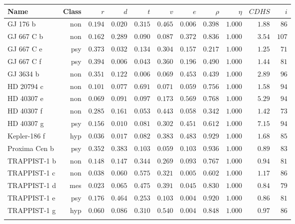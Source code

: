 \begin{tabular}{l r r r r r r r r r r}
  \toprule
  Name & Class & $r$ & $d$ & $t$ & $v$ & $e$ & $\rho$ & $\eta$ & $\mathit{CDHS}$ & $i$\\
  \midrule
GJ 176 b & non & $0.194$ & $0.020$ & $0.315$ & $0.465$ & $0.006$ & $0.398$ & $1.000$ & $1.88$ & $ 86$\\
GJ 667 C b & non & $0.162$ & $0.289$ & $0.090$ & $0.087$ & $0.372$ & $0.836$ & $1.000$ & $3.54$ & $107$\\
GJ 667 C e & psy & $0.373$ & $0.032$ & $0.134$ & $0.304$ & $0.157$ & $0.217$ & $1.000$ & $1.25$ & $ 71$\\
GJ 667 C f & psy & $0.394$ & $0.006$ & $0.043$ & $0.360$ & $0.196$ & $0.490$ & $1.000$ & $1.44$ & $ 81$\\
GJ 3634 b & non & $0.351$ & $0.122$ & $0.006$ & $0.069$ & $0.453$ & $0.439$ & $1.000$ & $2.89$ & $ 96$\\
HD 20794 c & non & $0.101$ & $0.077$ & $0.691$ & $0.071$ & $0.059$ & $0.756$ & $1.000$ & $1.58$ & $ 94$\\
HD 40307 e & non & $0.069$ & $0.091$ & $0.097$ & $0.173$ & $0.569$ & $0.768$ & $1.000$ & $5.29$ & $ 94$\\
HD 40307 f & non & $0.285$ & $0.161$ & $0.053$ & $0.443$ & $0.058$ & $0.342$ & $1.000$ & $1.42$ & $ 73$\\
HD 40307 g & psy & $0.156$ & $0.010$ & $0.081$ & $0.302$ & $0.451$ & $0.612$ & $1.000$ & $7.15$ & $ 94$\\
Kepler-186 f & hyp & $0.036$ & $0.017$ & $0.082$ & $0.383$ & $0.483$ & $0.929$ & $1.000$ & $1.68$ & $ 85$\\
Proxima Cen b & psy & $0.352$ & $0.383$ & $0.103$ & $0.059$ & $0.103$ & $0.936$ & $1.000$ & $0.89$ & $ 83$\\
TRAPPIST-1 b & non & $0.148$ & $0.147$ & $0.344$ & $0.269$ & $0.093$ & $0.767$ & $1.000$ & $0.94$ & $ 81$\\
TRAPPIST-1 c & non & $0.038$ & $0.060$ & $0.575$ & $0.321$ & $0.005$ & $0.602$ & $1.000$ & $1.17$ & $ 86$\\
TRAPPIST-1 d & mes & $0.023$ & $0.065$ & $0.475$ & $0.391$ & $0.045$ & $0.830$ & $1.000$ & $0.84$ & $ 79$\\
TRAPPIST-1 e & psy & $0.176$ & $0.464$ & $0.253$ & $0.103$ & $0.004$ & $0.920$ & $1.000$ & $0.86$ & $ 81$\\
TRAPPIST-1 g & hyp & $0.060$ & $0.086$ & $0.310$ & $0.540$ & $0.004$ & $0.848$ & $1.000$ & $0.97$ & $ 86$\\
  \bottomrule\\
\end{tabular}


